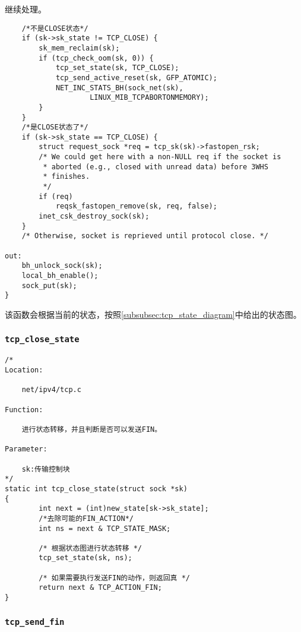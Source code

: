 	继续处理。
\begin{verbatim}
	/*不是CLOSE状态*/    
	if (sk->sk_state != TCP_CLOSE) {
        sk_mem_reclaim(sk);
        if (tcp_check_oom(sk, 0)) {
            tcp_set_state(sk, TCP_CLOSE);
            tcp_send_active_reset(sk, GFP_ATOMIC);
            NET_INC_STATS_BH(sock_net(sk),
                    LINUX_MIB_TCPABORTONMEMORY);
        }
    }
	/*是CLOSE状态了*/
    if (sk->sk_state == TCP_CLOSE) {
        struct request_sock *req = tcp_sk(sk)->fastopen_rsk;
        /* We could get here with a non-NULL req if the socket is
         * aborted (e.g., closed with unread data) before 3WHS
         * finishes.
         */
        if (req)
            reqsk_fastopen_remove(sk, req, false);
        inet_csk_destroy_sock(sk);
    }
    /* Otherwise, socket is reprieved until protocol close. */

out:
    bh_unlock_sock(sk);
    local_bh_enable();
    sock_put(sk);
}
\end{verbatim}

	该函数会根据当前的状态，按照\ref{subsubsec:tcp_state_diagram}中给出的状态图。


		\subsubsection{\texttt{tcp_close_state}}
\begin{verbatim}
/*
Location:

	net/ipv4/tcp.c

Function:

	进行状态转移，并且判断是否可以发送FIN。

Parameter:

	sk:传输控制块
*/
static int tcp_close_state(struct sock *sk)
{
        int next = (int)new_state[sk->sk_state];
		/*去除可能的FIN_ACTION*/        
		int ns = next & TCP_STATE_MASK;

        /* 根据状态图进行状态转移 */
        tcp_set_state(sk, ns);

        /* 如果需要执行发送FIN的动作，则返回真 */
        return next & TCP_ACTION_FIN;
}
\end{verbatim}

		\subsubsection{\texttt{tcp_send_fin}}

